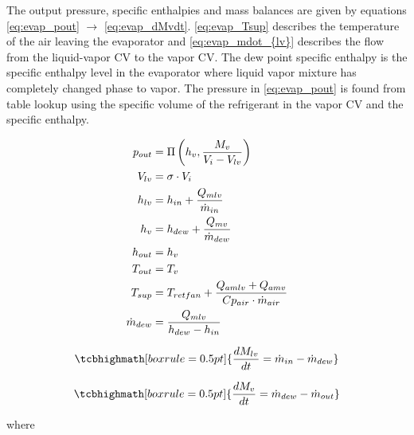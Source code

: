 \medskip
The output pressure, specific enthalpies and mass balances are given by equations \cref{eq:evap_pout} $\rightarrow$ \cref{eq:evap_dMvdt}. \cref{eq:evap_Tsup} describes the temperature of the air leaving the evaporator and \cref{eq:evap_mdot_{lv}} describes the flow from the liquid-vapor CV to the vapor CV. The dew point specific enthalpy is the specific enthalpy level in the evaporator where liquid vapor mixture has completely changed phase to vapor. The pressure in \cref{eq:evap_pout} is found from table lookup using the specific volume of the refrigerant in the vapor CV and the specific enthalpy.

\begin{align}
	p_{out}            & = \Pi \left( h_v, \frac{M_v}{V_i-V_{lv}} \right)		\label{eq:evap_pout}                       \\
	V_{lv}             & = \sigma \cdot V_i                                                                           \\
	h_{lv}             & = h_{in} + \frac{Q_{mlv}}{\dot{m}_{in}}                                                      \\
	h_v                & = h_{dew} + \frac{Q_{mv}}{\dot{m}_{dew}}               \label{eq:evap_hv}                                       \\
	h_{out}            & = h_v                                                                                       \\
	T_{out}            & = T_v                                                                                        \\
	T_{sup}            & = T_{retfan} +  \frac{Q_{amlv} + Q_{amv}}{Cp_{air} \cdot \dot{m}_{air}} \label{eq:evap_Tsup} \\
	\dot{m}_{dew}      & = \frac{Q_{mlv}}{h_{dew} - h_{in}} \label{eq:evap_mdot_{lv}}
\end{align}

\begin{equation}
	\tcbhighmath[boxrule = 0.5pt]{\frac{dM_{lv}}{dt} = \dot{m}_{in} - \dot{m}_{dew}  } 
\end{equation}

\begin{equation}
	\tcbhighmath[boxrule = 0.5pt]{\frac{dM_v}{dt}   = \dot{m}_{dew} - \dot{m}_{out}  }  \label{eq:evap_dMvdt}            
\end{equation}

where\\


